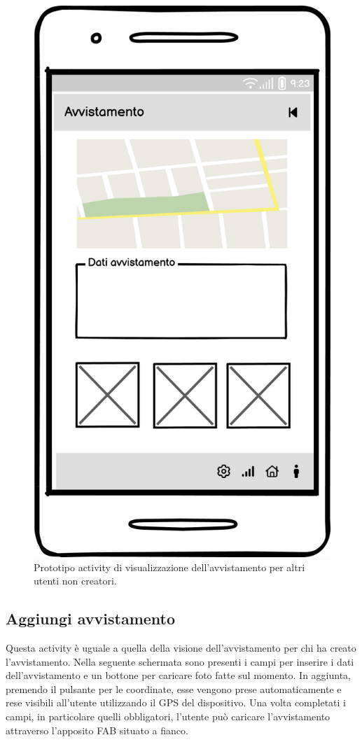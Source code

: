 \documentclass[a4paper,final,12pt]{report}
\begin{document}
\begin{figure}[hbtp]
\centering
\includegraphics[scale=0.50]{img_concettuale/Avv_mob.png}
\caption{Prototipo activity di visualizzazione dell'avvistamento per altri utenti non creatori.}
\end{figure}

\subsection{Aggiungi avvistamento}
Questa activity è uguale a quella della visione dell'avvistamento per chi ha creato l'avvistamento. Nella seguente schermata sono presenti i campi per inserire i dati dell'avvistamento e un bottone per caricare foto fatte sul momento. In aggiunta, premendo il pulsante per le coordinate, esse vengono prese automaticamente e rese visibili all'utente utilizzando il GPS del dispositivo. Una volta completati i campi, in particolare quelli obbligatori, l'utente può caricare l'avvistamento attraverso l'apposito FAB situato a fianco.
\end{document}
